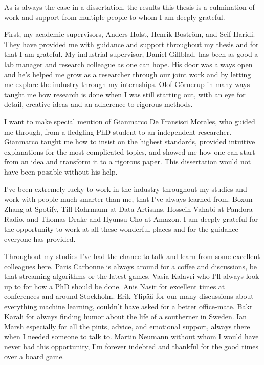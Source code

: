 \begin{acknowledgements}


As is always the case in a dissertation, the results this thesis is
a culmination of work and support from multiple people to whom I am
deeply grateful.

First, my academic supervisors, Anders Holst, Henrik Bostr\"{o}m, and Seif Haridi.
They have provided me with guidance and support throughout my thesis and for
that I am grateful.
My industrial supervisor, Daniel Gillblad, has been as good a lab manager and
research colleague as one can hope. His door was always open and he's helped me
grow as a researcher through our joint work and by letting me explore the industry through my
internships. Olof G\"{o}rnerup in many ways taught me how research is done when I
was still starting out, with an eye for detail, creative ideas and an adherence to rigorous
methods.

I want to make special mention of Gianmarco De Fransisci Morales, who
guided me through, from a fledgling PhD student to an independent researcher.
Gianmarco taught me how to insist on the highest standards, provided intuitive
explanations for the most complicated topics, and showed me how one can start
from an idea and transform it to a rigorous paper. This dissertation would
not have been possible without his help.

I've been extremely lucky to work in the industry throughout
my studies and work with people much smarter than me, that I've always learned
from. Boxun Zhang at Spotify, Till Rohrmann at Data Artisans, Hossein Vahabi
at Pandora Radio, and Thomas Drake and Hyunsu Cho at Amazon.
I am deeply grateful for the opportunity to work at all these wonderful
places and for the guidance everyone has provided.

Throughout my studies I've had the chance to talk and learn from some
excellent colleagues here. Paris Carbonne is always around
for a coffee and discussions, be that streaming algorithms or the latest
games. Vasia Kalavri who I'll always look up to for how a PhD should be done.
Anis Nasir for excellent times at conferences and around Stockholm.
Erik Ylip\"{a}\"{a} for our many discussions about everything machine
learning, couldn't have asked for a better office-mate.
Bakr Karali for always finding humor about the life of a southerner
in Sweden. Ian Marsh especially for all the pints, advice, and
emotional support, always there when I needed someone to talk to.
Martin Neumann without whom I would have never had this opportunity,
I'm forever indebted and thankful for the good times over a board game.


\end{acknowledgements}
